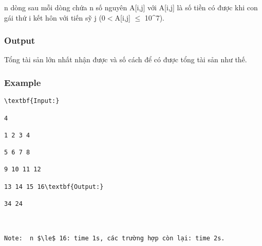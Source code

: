    n dòng sau mỗi dòng chứa n số nguyên A[i,j] với A[i,j] là số tiền có được khi con gái thứ i kết hôn với tiến sỹ j (0$<$A[i,j] $\le$ 10^7).  

\subsubsection{   Output  }

   Tổng tài sản lớn nhất nhận được và số cách để có được tổng tài sản như thế.  

\subsubsection{   Example  }
\begin{verbatim}
\textbf{Input:}

4

1 2 3 4

5 6 7 8

9 10 11 12

13 14 15 16\textbf{Output:}

34 24

 

Note:  n $\le$ 16: time 1s, các trường hợp còn lại: time 2s.\end{verbatim}
